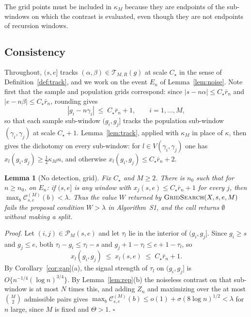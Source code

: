 \documentclass[12pt, a4paper]{article}
\newcommand{\qed}{\hfill$\square$}
\newenvironment{proof}[1][Proof]{\par\noindent\textit{#1.}\space}{\qed\par\medskip}
\newtheorem{lemma}{Lemma}[section]
\begin{document}
The grid points must be included in $\kappa_M$ because they are endpoints of
the sub-windows on which the contrast is evaluated, even though they are not
endpoints of recursion windows.

\subsection{Consistency}
\label{sup:gridthm}

Throughout, $(s,e]$ tracks $(\alpha,\beta) \in \mathcal{T}_{M,R}(g)$ at scale
$C_\star$ in the sense of Definition~\ref{def:track}, and we work on the event $E_n$ of
Lemma~\ref{lem:noise}. Note first that the sample and population grids
correspond: since $|s - n\alpha| \le C_\star \bar r_n$ and
$|e - n\beta| \le C_\star\bar r_n$, rounding gives
\begin{equation}
\label{eq:gridtrack}
| g_i - n \gamma_i | \;\le\; C_\star \bar r_n + 1, \qquad i = 1,\ldots,M,
\end{equation}
so that each sample sub-window $(g_i,g_j]$ tracks the population sub-window
$(\gamma_i,\gamma_j)$ at scale $C_\star + 1$. Lemma~\ref{lem:track}, applied
with $\kappa_M$ in place of $\kappa$, then gives the dichotomy on every
sub-window: for $l \in V(\gamma_i,\gamma_j)$ one has
$x_l(g_i,g_j) \ge \tfrac12\kappa_M n$, and otherwise
$x_l(g_i,g_j) \le C_\star\bar r_n + 2$.

\begin{lemma}[No detection, grid]
\label{lem:gnodet}
Fix $C_\star$ and $M \ge 2$. There is $n_0$ such that for $n \ge n_0$, on
$E_n$: if $(s,e]$ is any window with $x_j(s,e) \le C_\star\bar r_n + 1$ for
every $j$, then $\max_b \mathcal{C}^{(M)}_{s,e}(b) < \lambda$. Thus the value
$W$ returned by $\textnormal{\textsc{GridSearch}}(X,s,e,M)$ fails the proposal condition
$W>\lambda$ in Algorithm~S1, and the call returns $\emptyset$ without making a
split.
\end{lemma}

\begin{proof}
Let $(i,j) \in \mathcal{P}_M(s,e)$ and let $\tau_l$ lie in the interior of
$(g_i,g_j]$. Since $g_i \ge s$ and $g_j \le e$, both $\tau_l - g_i \le \tau_l - s$ and $g_j + 1 - \tau_l \le e + 1 - \tau_l$, so
\begin{equation}
\label{eq:grid-edge-distance}
x_l(g_i,g_j) \;\le\; x_l(s,e) \;\le\; C_\star\bar r_n + 1 .
\end{equation}
By Corollary~\ref{cor:gap}(a), the signal strength of $\tau_l$ on $(g_i,g_j]$ is
$O\{n^{-1/4}(\log n)^{3/4}\}$. By Lemma~\ref{lem:rep}(b) the noiseless
contrast on that sub-window is at most $N$ times this, and adding
$Z_n$ and maximizing over the at most $\binom{M}{2}$ admissible pairs gives
$\max_b \mathcal{C}^{(M)}_{s,e}(b) \le o(1) + \sigma(8\log n)^{1/2} < \lambda$
for $n$ large, since $M$ is fixed and $\Theta > 1$.
\end{proof}
\end{document}
